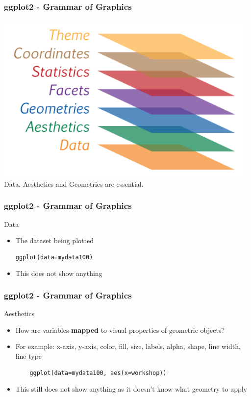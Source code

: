 \documentclass[xcolor={svgnames},10pt,
handout
]{beamer}
\begin{document}
\begin{frame}[fragile]\frametitle{ggplot2 - Grammar of Graphics}
\includegraphics[width=\textwidth]{ggplot-layers.png}
Data, Aesthetics and Geometries are essential.
\end{frame}

\begin{frame}[fragile]\frametitle{ggplot2 - Grammar of Graphics}
Data
\begin{itemize}
\item The dataset being plotted
\begin{lstlisting}
ggplot(data=mydata100)
\end{lstlisting}
\item This does not show anything
\end{itemize}
\end{frame}

\begin{frame}[fragile]\frametitle{ggplot2 - Grammar of Graphics}
Aesthetics
\begin{itemize}
	\item How are variables \textbf{mapped} to visual properties of geometric objects?
	\item For example: x-axis, y-axis, color, fill, size, labels, alpha, shape, line width, line type
	\begin{lstlisting}
	ggplot(data=mydata100, aes(x=workshop))
	\end{lstlisting}
	\item This still does not show anything as it doesn’t know what geometry to apply
\end{itemize}
\end{frame}
\end{document}
